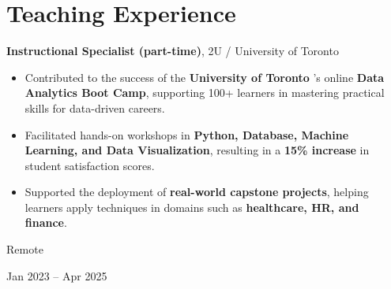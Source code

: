 \documentclass[10pt, letterpaper]{article}
\newenvironment{highlights}{
    \begin{itemize}[
        topsep=0.10 cm,
        parsep=0.10 cm,
        partopsep=0pt,
        itemsep=0pt,
        leftmargin=0.4 cm + 10pt
    ]
}{
    \end{itemize}
} %
\newenvironment{twocolentry}[2][]{
    \onecolentry
    \def\secondColumn{#2}
    \setcolumnwidth{\fill, 4.5 cm}
    \begin{paracol}{2}
}{
    \switchcolumn \raggedleft \secondColumn
    \end{paracol}
    \endonecolentry
} %
\begin{document}
    \section{Teaching Experience}

\begin{twocolentry}{
    Remote

    Jan 2023 – Apr 2025
}
    \textbf{Instructional Specialist (part-time)}, 2U / University of Toronto

    \begin{highlights}
        \item Contributed to the success of the \textbf{University of Toronto} 's online \textbf{Data Analytics Boot Camp}, supporting 100+ learners in mastering practical skills for data-driven careers.
        \item Facilitated hands-on workshops in \textbf{Python, Database, Machine Learning, and Data Visualization}, resulting in a \textbf{15\% increase} in student satisfaction scores.
        \item Supported the deployment of \textbf{real-world capstone projects}, helping learners apply techniques in domains such as \textbf{healthcare, HR, and finance}.
    \end{highlights}
\end{twocolentry}
\end{document}
